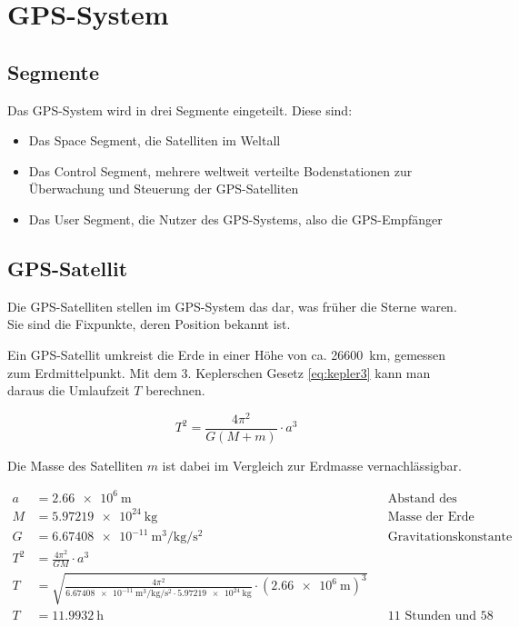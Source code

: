 \documentclass[12pt,a4paper]{scrartcl}
\begin{document}
\section{GPS-System}

\subsection{Segmente}
Das GPS-System wird in drei Segmente eingeteilt. Diese sind:
\begin{itemize}
\item Das Space Segment, die Satelliten im Weltall
\item Das Control Segment, mehrere weltweit verteilte Bodenstationen zur Überwachung und Steuerung der GPS-Satelliten
\item Das User Segment, die Nutzer des GPS-Systems, also die GPS-Empfänger
\end{itemize}
\cite{gpsgov_segments}

\subsection{GPS-Satellit}
Die GPS-Satelliten stellen im GPS-System das dar, was früher die Sterne waren. Sie sind die Fixpunkte, deren Position bekannt ist.

Ein GPS-Satellit umkreist die Erde in einer Höhe von ca. \SI{26600}{\kilo\meter}, gemessen zum Erdmittelpunkt.
Mit dem 3. Keplerschen Gesetz \eqref{eq:kepler3} kann man daraus die Umlaufzeit $T$ berechnen.

\begin{equation}
\label{eq:kepler3}
T^2 = \frac{4 \pi^2}{G (M + m)} \cdot a^3
\end{equation}
\cite{wiki_kepler}

Die Masse des Satelliten $m$ ist dabei im Vergleich zur Erdmasse vernachlässigbar.

\begin{align*}
a &= \SI{2.66e6}{\meter} && \text{Abstand des Satelliten}\\
M &= \SI{5.97219e24}{\kilo\gram} && \text{Masse der Erde}\\
G &= \SI{6.67408e-11}{\cubic\meter\per\kilo\gram\per\square\second} && \text{Gravitationskonstante} \\
T^2 &= \frac{4 \pi^2}{G M} \cdot a^3 \\
T &= \sqrt{\frac{4 \pi^2}{\SI{6.67408e-11}{\cubic\meter\per\kilo\gram\per\square\second} \cdot \SI{5.97219e24}{\kilo\gram}} \cdot (\SI{2.66e6}{\meter})^3} \\
T &= \SI{11.9932}{\hour} && \text{11 Stunden und 58 Minuten}
\end{align*}
\end{document}
